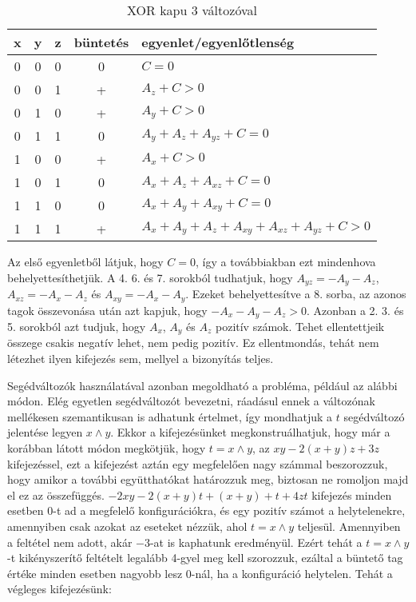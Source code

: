 \begin{table}[ht]
	\footnotesize
	\centering
	\begin{tabular}{ c c c c l }
		\toprule
		x & y & z & büntetés & egyenlet/egyenlőtlenség \\
		\midrule
		0 & 0 & 0 & 0 & $C=0$   \\
		0 & 0 & 1 & + & $A_{z}+C>0$ \\
		0 & 1 & 0 & + & $A_{y}+C>0$ \\
		0 & 1 & 1 & 0 & $A_{y}+A_{z}+A_{yz}+C=0$   \\
		1 & 0 & 0 & + & $A_{x}+C>0$ \\
		1 & 0 & 1 & 0 & $A_{x}+A_{z}+A_{xz}+C=0$   \\
		1 & 1 & 0 & 0 & $A_{x}+A_{y}+A_{xy}+C=0$   \\
		1 & 1 & 1 & + & $A_{x}+A_{y}+A_{z}+A_{xy}+A_{xz}+A_{yz}+C>0$ \\			
		\bottomrule
	\end{tabular}
	\caption{XOR kapu 3 változóval}
	\label{tab:XORgate3var}
\end{table}

Az első egyenletből látjuk, hogy $C=0$, így a továbbiakban ezt mindenhova behelyettesíthetjük. A 4. 6. és 7. sorokból tudhatjuk, hogy $A_{yz}=-A_y-A_z$, $A_{xz}=-A_x-A_z$ és $A_{xy}=-A_x-A_y$. Ezeket behelyettesítve a 8. sorba, az azonos tagok összevonása után azt kapjuk, hogy $-A_x-A_y-A_z>0$.
Azonban a 2. 3. és 5. sorokból azt tudjuk, hogy $A_x$, $A_y$ és $A_z$ pozitív számok. Tehet ellentettjeik összege csakis negatív lehet, nem pedig pozitív. Ez ellentmondás, tehát nem létezhet ilyen kifejezés sem, mellyel a bizonyítás teljes.

Segédváltozók használatával azonban megoldható a probléma, például az alábbi módon. Elég egyetlen segédváltozót bevezetni, ráadásul ennek a változónak mellékesen szemantikusan is adhatunk értelmet, így mondhatjuk a $t$ segédváltozó jelentése legyen $x \wedge y$.
Ekkor a kifejezésünket megkonstruálhatjuk, hogy már a korábban látott módon megkötjük, hogy $t = x \wedge y$, az $xy-2(x+y)z+3z$ kifejezéssel, ezt a kifejezést aztán egy megfelelően nagy számmal beszorozzuk, hogy amikor a további együtthatókat határozzuk meg, biztosan ne romoljon majd el ez az összefüggés. $-2xy-2(x+y)t+(x+y)+t+4zt$ kifejezés minden esetben $0$-t ad a megfelelő konfigurációkra, és egy pozitív számot a helytelenekre, amennyiben csak azokat az eseteket nézzük, ahol $t = x \wedge  y$ teljesül. Amennyiben a feltétel nem adott, akár $-3$-at is kaphatunk eredményül. Ezért tehát a $t = x \wedge  y$-t kikényszerítő feltételt legalább 4-gyel meg kell szorozzuk, ezáltal a büntető tag értéke minden esetben nagyobb lesz $0$-nál, ha a konfiguráció helytelen. Tehát a végleges kifejezésünk:



